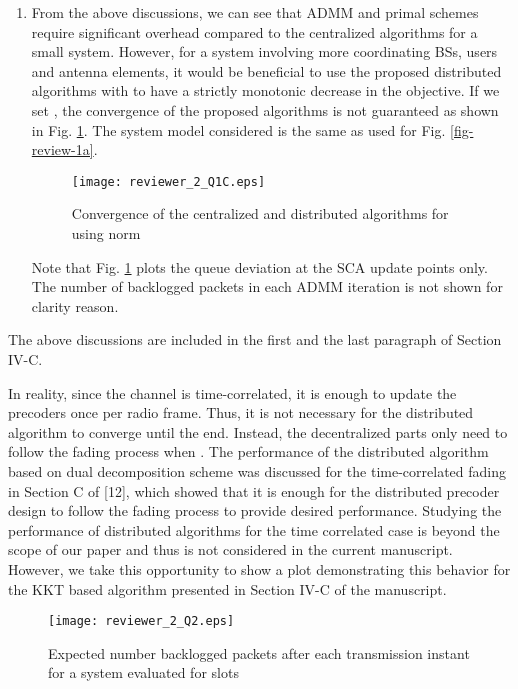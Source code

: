 \begin{enumerate}
\begin{enumerate}
		\item From the above discussions, we can see that \ac{ADMM} and primal schemes require significant overhead compared to the centralized algorithms for a small system. However, for a system involving more coordinating \acp{BS}, users and antenna elements, it would be beneficial to use the proposed distributed algorithms with  to have a strictly monotonic decrease in the objective. If we set , the convergence of the proposed algorithms is not guaranteed as shown in Fig. \ref{fig-review-2-a}. The system model considered is the same as used for Fig. \ref{fig-review-1a}.
		\begin{figure}[h!]
			\centering
			\texttt{[image: reviewer\_2\_Q1C.eps]}
			\caption{Convergence of the centralized and distributed algorithms for  using  norm}
			\label{fig-review-2-a}
		\end{figure}
		Note that Fig. \ref{fig-review-2-a} plots the queue deviation at the \ac{SCA} update points only. The number of backlogged packets in each \ac{ADMM} iteration is not shown for clarity reason.		
		
	\end{enumerate}
	
	The above discussions are included in the first and the last paragraph of Section IV-C. 
	
	In reality, since the channel is time-correlated, it is enough to update the precoders once per radio frame. Thus, it is not necessary for the distributed algorithm to converge until the end. Instead, the decentralized parts only need to follow the fading process when . The performance of the distributed algorithm based on dual decomposition scheme was discussed for the time-correlated fading in Section C of [12], which showed that it is enough for the distributed precoder design to follow the fading process to provide desired performance. Studying the performance of distributed algorithms for the time correlated case is beyond the scope of our paper and thus is not considered in the current manuscript. However, we take this opportunity to show a plot demonstrating this behavior for the \ac{KKT} based algorithm presented in Section IV-C of the manuscript.
	\begin{figure}[h!]
		\centering
		\texttt{[image: reviewer\_2\_Q2.eps]}
		\caption{Expected number backlogged packets after each transmission instant for a system  evaluated for  slots}
		\label{fig-review-2}
	\end{figure}
		

\end{enumerate}

